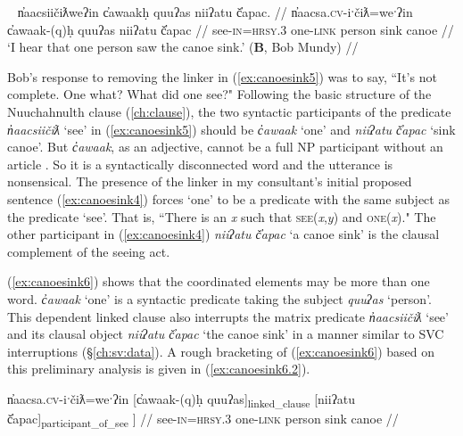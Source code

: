 \ex~ \label{ex:canoesink6}
\begingl
\glpreamble n̓aacsiičiƛweʔin c̓awaakḥ quuʔas niiʔatu č̓apac. //
\gla n̓aacsa.\textsc{cv}-iˑčiƛ=weˑʔin c̓awaak-(q)ḥ quuʔas niiʔatu č̓apac //
\glb see-\textsc{in}=\textsc{hrsy.3} one-\textsc{link} person sink canoe //
\glft `I hear that one person saw the canoe sink.' (\textbf{B}, Bob Mundy) //
\endgl
\xe

Bob's response to removing the linker in (\ref{ex:canoesink5}) was to say, ``It's not complete. One what? What did one see?" Following the basic structure of the Nuuchahnulth clause (\cref{ch:clause}), the two syntactic participants of the predicate \textit{n̓aacsiičiƛ} `see' in (\ref{ex:canoesink5}) should be \textit{c̓awaak} `one' and \textit{niiʔatu č̓apac} `sink canoe'. But \textit{c̓awaak}, as an adjective, cannot be a full NP participant without an article \citep{jacobsen1979}. So it is a syntactically disconnected word and the utterance is nonsensical. The presence of the linker in my consultant's initial proposed sentence (\ref{ex:canoesink4}) forces `one' to be a predicate with the same subject as the predicate `see'. That is, ``There is an \textit{x} such that \textsc{see}(\textit{x},\textit{y}) and \textsc{one}(\textit{x})." The other participant in (\ref{ex:canoesink4}) \textit{niiʔatu č̓apac} `a canoe sink' is the clausal complement of the seeing act.

(\ref{ex:canoesink6}) shows that the coordinated elements may be more than one word. \textit{c̓awaak} `one' is a syntactic predicate taking the subject \textit{quuʔas} `person'.  This dependent linked clause also interrupts the matrix predicate \textit{n̓aacsiičiƛ} `see' and its clausal object \textit{niiʔatu č̓apac} `the canoe sink' in a manner similar to SVC interruptions (\S\ref{ch:sv:data}). A rough bracketing of (\ref{ex:canoesink6}) based on this preliminary analysis is given in (\ref{ex:canoesink6.2}).

\ex \label{ex:canoesink6.2}
\begingl
\gla {[}n̓aacsa.\textsc{cv}-iˑčiƛ=weˑʔin {[}c̓awaak-(q)ḥ quuʔas{]\textsubscript{linked\_clause}} {[}niiʔatu č̓apac{]\textsubscript{participant\_of\_see} ]} //
\glb see-\textsc{in}=\textsc{hrsy.3} one-\textsc{link} person sink canoe //
\endgl
\xe

